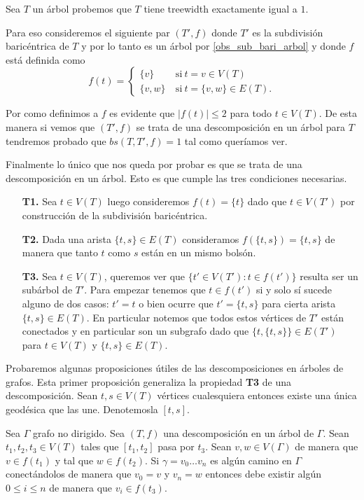 \documentclass[tesis.tex]{subfiles}
\begin{document}
\begin{ej}\label{desc-arbol-arbol}
	Sea $T$ un árbol probemos que $T$ tiene treewidth exactamente igual a $1$.
	
	Para eso consideremos el siguiente par $(T',f)$ donde $T'$ es la subdivisión baricéntrica de $T$ y por lo tanto es un árbol por \ref{obs_sub_bari_arbol} y donde $f$ está definida como
	\[
	f(t) = 
	\begin{cases}
		\{ v \} \ & \text{si} \ t = v \in V(T) 				\\
		\{ v,w  \} \ &\text{si} \ t = \{ v,w\} \in E(T).
	\end{cases}
	\]
	
	
	Por como definimos a $f$ es evidente que $|f(t)| \le 2$ para todo $t \in V(T)$.
	De esta manera si vemos que $(T',f)$ se trata de una descomposición en un árbol para $T$ tendremos probado que $bs(T,T',f) = 1$ tal como queríamos ver.
	
	Finalmente lo único que nos queda por probar es que se trata de una descomposición en un árbol.
	Esto es que cumple las tres condiciones necesarias.
	\begin{enumerate}
		\item[\textbf{T1.}] 
		Sea $t \in V(T)$ luego consideremos $f(t) = \{ t \}$ dado que $t \in V(T')$ por construcción de la subdivisión baricéntrica.
		
		\item[\textbf{T2.}] 
		Dada una arista $\{t,s\} \in E(T)$ consideramos $f(\{ t,s \}) = \{ t,s \} $ de manera que tanto $t$ como $s$ están en un mismo bolsón.
		
		\item[\textbf{T3.}] 
		Sea $t \in V(T)$, queremos ver que $\{ t' \in V(T') :  t \in f(t') \}$ resulta ser un subárbol de $T'$.		
		Para empezar tenemos que $t \in f(t')$ si y solo sí sucede alguno de dos casos:
		$t' = t$ o bien ocurre que $t' = \{ t,s \}$ para cierta arista $\{t,s\} \in E(T)$.
		En particular notemos que todos estos vértices de $T'$ están conectados y en particular son un subgrafo dado que $ \{t, \{t,s\}\} \in E(T')$ para $t \in V(T)$ y $\{t,s\} \in E(T)$. 
	\end{enumerate}
	
	
\end{ej}

Probaremos algunas proposiciones útiles de las descomposiciones en árboles de grafos.
Esta primer proposición generaliza la propiedad \textbf{T3} de una descomposición.
Sean $t,s \in V(T)$ vértices cualesquiera entonces existe una única geodésica que las une. 
Denotemosla $[t,s]$.
\begin{prop}\label{prop-camino-desc}
	Sea $\Gamma$ grafo no dirigido.
	Sea $(T,f)$ una descomposición en un árbol de $\Gamma$.
	Sean $t_{1},t_{2},t_{3} \in V(T)$ tales que $[t_1,t_2]$ pasa por $t_{3}$.
	Sean $v,w \in V(\Gamma)$ de manera que $v \in f(t_{1})$ y tal que $w \in f(t_{2})$.
	Si $\gamma = v_0 \dots v_n$ es algún camino en $\Gamma$ conectándolos de manera que $v_{0}=v$ y $v_{n} = w$	
	entonces debe existir algún $ 0 \le i \le n$ de manera que $v_i \in f(t_{3})$. 
\end{prop}
\end{document}
